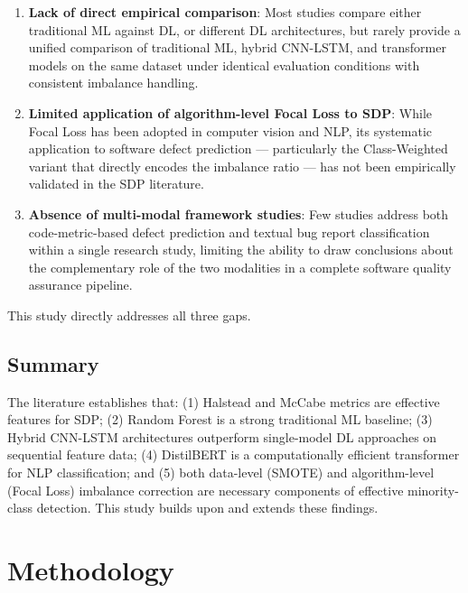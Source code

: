 \documentclass[12pt,a4paper,oneside]{report}
\begin{document}
\begin{enumerate}
  \item \textbf{Lack of direct empirical comparison}: Most studies compare either traditional ML against DL, or different DL architectures, but rarely provide a unified comparison of traditional ML, hybrid CNN-LSTM, and transformer models on the same dataset under identical evaluation conditions with consistent imbalance handling.

  \item \textbf{Limited application of algorithm-level Focal Loss to SDP}: While Focal Loss has been adopted in computer vision and NLP, its systematic application to software defect prediction --- particularly the Class-Weighted variant that directly encodes the imbalance ratio --- has not been empirically validated in the SDP literature.

  \item \textbf{Absence of multi-modal framework studies}: Few studies address both code-metric-based defect prediction and textual bug report classification within a single research study, limiting the ability to draw conclusions about the complementary role of the two modalities in a complete software quality assurance pipeline.
\end{enumerate}

This study directly addresses all three gaps.

\section{Summary}

The literature establishes that: (1) Halstead and McCabe metrics are effective features for SDP; (2) Random Forest is a strong traditional ML baseline; (3) Hybrid CNN-LSTM architectures outperform single-model DL approaches on sequential feature data; (4) DistilBERT is a computationally efficient transformer for NLP classification; and (5) both data-level (SMOTE) and algorithm-level (Focal Loss) imbalance correction are necessary components of effective minority-class detection. This study builds upon and extends these findings.

\chapter{Methodology}
\end{document}
